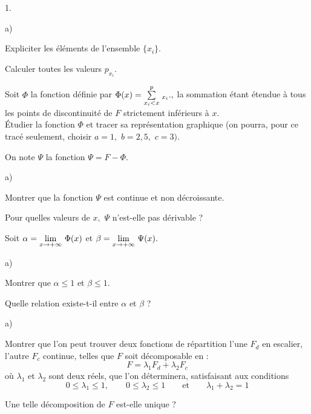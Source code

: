 \documentclass[11pt]{article}%
\begin{document}
\begin{noliste}{1.}
 \setlength{\itemsep}{4mm}
\item 

\begin{noliste}{a)}
 \setlength{\itemsep}{2mm}
\item Expliciter les éléments de l'ensemble $\{x_{i}\}.$

\item Calculer toutes les valeurs $p_{x_{i}}.$
\end{noliste}

\item Soit $\Phi $ la fonction définie par $\Phi
(x) = {\textstyle\sum\limits_{x_{i}<x}^{p}}\hspace{.1cm}_{x_{i}}.,$ la sommation étant étendue à tous les
points de discontinuité de $F$ strictement inférieurs à $x.$\\
Étudier la fonction $\Phi $ et tracer sa représentation graphique (on
pourra, pour ce tracé seulement, choisir $a = 1,$ $b = 2,5,$ $c = 3).$

\item On note $\Psi $ la fonction $\Psi = F-\Phi.$

\begin{noliste}{a)}
 \setlength{\itemsep}{2mm}
\item Montrer que la fonction $\Psi $ est continue et non décroissante.

\item Pour quelles valeurs de $x,$ $\Psi $ n'est-elle pas dérivable ?
\end{noliste}

\item Soit $\alpha = {\displaystyle \lim_{x\rightarrow + \infty } \ }\Phi (x)$ et $\beta
 = {\displaystyle \lim_{x\rightarrow + \infty } \ }\Psi (x).$

\begin{noliste}{a)}
 \setlength{\itemsep}{2mm}
\item Montrer que $\alpha \leq 1$ et $\beta \leq 1.$

\item Quelle relation existe-t-il entre $\alpha $ et $\beta $ ?
\end{noliste}

\item 

\begin{noliste}{a)}
 \setlength{\itemsep}{2mm}
\item Montrer que l'on peut trouver deux fonctions de répartition l'une
$F_{d}$ en escalier, l'autre $F_{c}$ continue, telles que $F$ soit
décomposable en :
\[
F = \lambda_{1}F_{d} + \lambda_{2}F_{c}
\]
où $\lambda_{1}$ et $\lambda_{2}$ sont deux réels, que l'on
déterminera,
satisfaisant aux conditions 
\[
0\leq \lambda_{1}\leq 1,\qquad 0\leq \lambda_{2}\leq
1\qquad \text{et}\qquad \lambda_{1} + \lambda_{2} = 1
\]

\item Une telle décomposition de $F$ est-elle unique ?
\end{noliste}
\end{noliste}

\label{fin}
\end{document}
